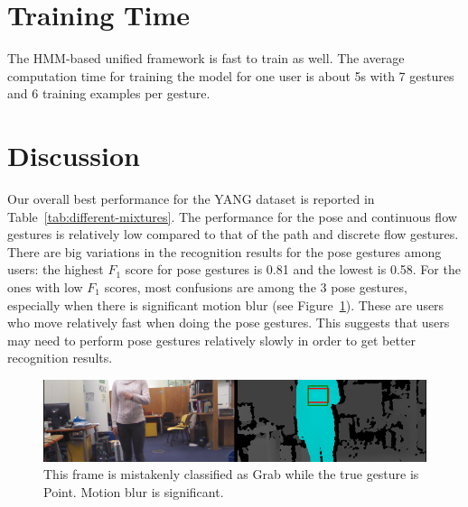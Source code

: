 \section{Training Time}
The HMM-based unified framework is fast to train as well. The average
computation time for training the model for one user is about 5s with 7 gestures and 6 training examples per
gesture.

\section{Discussion}
Our overall best performance for the YANG dataset is reported in
Table~\ref{tab:different-mixtures}. The performance for the pose and
continuous flow gestures is relatively low compared to that of the path and
discrete flow gestures. There are big variations in the recognition results for
the pose gestures among users: the highest $F_1$ score for pose gestures is 0.81
and the lowest is 0.58. For the ones with low $F_1$ scores, most
confusions are among the 3 pose gestures, especially when there is significant
motion blur (see Figure~\ref{fig:point_grab}). These are users who move
relatively fast when doing the pose gestures. This suggests that users may need to perform pose gestures relatively slowly in order to get better recognition results.

\begin{figure}[tbh]
\centering
\includegraphics[width=\linewidth]{figures/point_posture_full_image.png}
\caption{This frame is mistakenly classified as Grab while the true gesture
is Point. Motion blur is significant.}
\label{fig:point_grab}
\end{figure}
